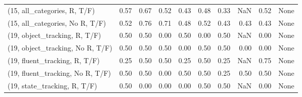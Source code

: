 \begin{table*}[h!]
\begin{adjustbox}{width=2\columnwidth,center}
\begin{tabular}{lrrr|rrr|rrr}
(15, all\_categories, R, T/F)          &                      0.57 &                  0.67 &                      0.52 &                          0.43 &                      0.48 &                          0.33 &                                    NaN &                               0.52 &                                  None \\
(15, all\_categories, No R, T/F)       &                      0.52 &                  0.76 &                      0.71 &                          0.48 &                      0.52 &                          0.43 &                                   0.43 &                               0.43 &                                  None \\



\midrule
(19, object\_tracking, R, T/F)         &                      0.50 &                  0.50 &                      0.00 &                          0.50 &                      0.00 &                          0.50 &                                    NaN &                               0.00 &                                  None \\
(19, object\_tracking, No R, T/F)      &                      0.50 &                  0.50 &                      0.50 &                          0.00 &                      0.50 &                          0.50 &                                   0.00 &                               0.00 &                                  None \\
(19, fluent\_tracking, R, T/F)         &                      0.25 &                  0.50 &                      0.50 &                          0.25 &                      0.50 &                          0.25 &                                    NaN &                               0.75 &                                  None \\
(19, fluent\_tracking, No R, T/F)      &                      0.50 &                  0.50 &                      0.00 &                          0.50 &                      0.50 &                          0.25 &                                   0.50 &                               0.50 &                                  None \\
(19, state\_tracking, R, T/F)          &                      0.50 &                  0.00 &                      0.00 &                          0.00 &                      0.50 &                          0.50 &                                    NaN &                               0.00 &                                  None \\

\end{tabular}
\end{adjustbox}
\end{table*}
